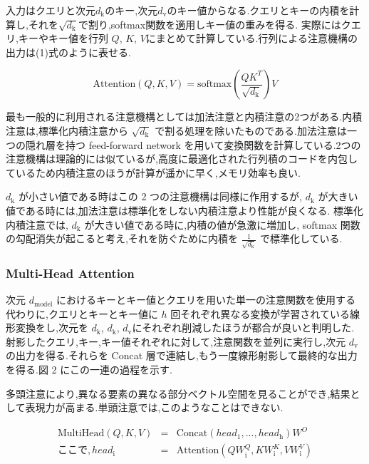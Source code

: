 \documentclass{jarticle}     %
\begin{document}
入力はクエリと次元$d_\mathrm{k}$のキー,次元$d_\mathrm{v}$のキー値からなる.クエリとキーの内積を計算し,それを$\sqrt{d_\mathrm{k}}$で割り,softmax関数を適用しキー値の重みを得る.
実際にはクエリ,キーやキー値を行列 $Q$, $K$, $V$にまとめて計算している.行列による注意機構の出力は(1)式のように表せる.

\begin{equation}
  \mathrm{Attention}(Q,K,V) = \mathrm{softmax}(\frac{QK^T}{\sqrt{d_\mathrm{k}}})V
\end{equation}

\par

最も一般的に利用される注意機構としては加法注意と内積注意の2つがある.内積注意は,標準化内積注意から $\sqrt{d_\mathrm{k}}$ で割る処理を除いたものである.加法注意は一つの隠れ層を持つ feed-forward network を用いて変換関数を計算している.2つの注意機構は理論的には似ているが,高度に最適化された行列積のコードを内包しているため内積注意のほうが計算が遥かに早く,メモリ効率も良い.\par
$d_\mathrm{k}$ が小さい値である時はこの 2 つの注意機構は同様に作用するが, $d_\mathrm{k}$ が大きい値である時には,加法注意は標準化をしない内積注意より性能が良くなる. 標準化内積注意では, $d_\mathrm{k}$ が大きい値である時に,内積の値が急激に増加し, softmax 関数の勾配消失が起こると考え,それを防ぐために内積を $\frac{1}{\sqrt{d_\mathrm{k}}}$ で標準化している.

\subsubsection{Multi-Head Attention}
次元 $d_\mathrm{model}$ におけるキーとキー値とクエリを用いた単一の注意関数を使用する代わりに,クエリとキーとキー値に $h$ 回それぞれ異なる変換が学習されている線形変換をし,次元を $d_\mathrm{k}$, $d_\mathrm{k}$, $d_\mathrm{v}$にそれぞれ削減したほうが都合が良いと判明した.
射影したクエリ,キー,キー値それぞれに対して,注意関数を並列に実行し,次元 $d_\mathrm{v}$ の出力を得る.それらを Concat 層で連結し,もう一度線形射影して最終的な出力を得る.図 2 にこの一連の過程を示す.
\par
多頭注意により,異なる要素の異なる部分ベクトル空間を見ることができ,結果として表現力が高まる.\cite{Multihead}単頭注意では,このようなことはできない.
\par

\begin{eqnarray*}
  \mathrm{MultiHead}(Q,K,V)&  = & \mathrm{Concat}(head_\mathrm{1},...,head_\mathrm{h})W^O   \\
  ここで, head_\mathrm{i} & = & \mathrm{Attention}(QW_\mathrm{i}^Q,KW_\mathrm{i}^K,VW_\mathrm{i}^V)
\end{eqnarray*}
\end{document}
